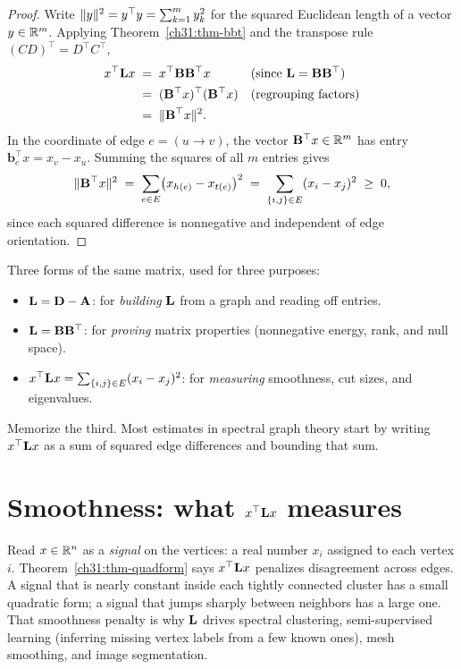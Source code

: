 \begin{proof}
Write $\lVert y\rVert^2 = y^\top y = \sum_{k=1}^m y_k^2$ for the squared Euclidean length of a vector $y \in \mathbb{R}^m$. Applying Theorem~\ref{ch31:thm-bbt} and the transpose rule $(CD)^\top = D^\top C^\top$,
\begin{align*}
  x^\top \mathbf{L} x
  &\;=\; x^\top \mathbf{B}\mathbf{B}^\top x && \text{(since $\mathbf{L} = \mathbf{B}\mathbf{B}^\top$)}\\
  &\;=\; (\mathbf{B}^\top x)^\top (\mathbf{B}^\top x) && \text{(regrouping factors)}\\
  &\;=\; \lVert\mathbf{B}^\top x\rVert^2 .
\end{align*}
In the coordinate of edge $e=(u\to v)$, the vector $\mathbf{B}^\top x \in \mathbb{R}^m$ has entry $\mathbf{b}_e^\top x = x_v - x_u$. Summing the squares of all $m$ entries gives
\[
  \lVert\mathbf{B}^\top x\rVert^2
  \;=\; \sum_{e\in E} \bigl(x_{h(e)} - x_{t(e)}\bigr)^2
  \;=\; \sum_{\{i,j\}\in E}(x_i - x_j)^2 \;\ge\; 0,
\]
since each squared difference is nonnegative and independent of edge orientation.
\end{proof}

\begin{focusbox}
Three forms of the same matrix, used for three purposes:
\begin{itemize}
  \item $\mathbf{L} = \mathbf{D} - \mathbf{A}$: for \emph{building} $\mathbf{L}$ from a graph and reading off entries.
  \item $\mathbf{L} = \mathbf{B}\mathbf{B}^\top$: for \emph{proving} matrix properties (nonnegative energy, rank, and null space).
  \item $x^\top\mathbf{L} x = \sum_{\{i,j\}\in E}(x_i-x_j)^2$: for \emph{measuring} smoothness, cut sizes, and eigenvalues.
\end{itemize}
Memorize the third. Most estimates in spectral graph theory start by writing $x^\top \mathbf{L} x$ as a sum of squared edge differences and bounding that sum.
\end{focusbox}

\section{Smoothness: what \texorpdfstring{$x^\top \mathbf{L} x$}{x\^T L x} measures}

Read $x \in \mathbb{R}^n$ as a \emph{signal} on the vertices: a real number $x_i$ assigned to each vertex $i$. Theorem~\ref{ch31:thm-quadform} says $x^\top \mathbf{L} x$ penalizes disagreement across edges. A signal that is nearly constant inside each tightly connected cluster has a small quadratic form; a signal that jumps sharply between neighbors has a large one. That smoothness penalty is why $\mathbf{L}$ drives spectral clustering, semi-supervised learning (inferring missing vertex labels from a few known ones), mesh smoothing, and image segmentation.


